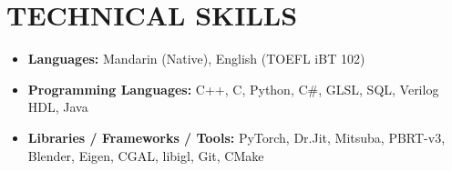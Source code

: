 \documentclass{resume}
\begin{document}
\section{TECHNICAL SKILLS}
\begin{itemize}[parsep=0.5ex]
  \item \textbf{Languages:} Mandarin (Native), English (TOEFL iBT 102)
  \item \textbf{Programming Languages:} C++, C, Python, C\#, GLSL, SQL, Verilog HDL, Java
  \item \textbf{Libraries / Frameworks / Tools:} PyTorch, Dr.Jit, Mitsuba, PBRT-v3, Blender, Eigen, CGAL, libigl, Git, CMake 
  
\end{itemize}



%
%
\end{document}
